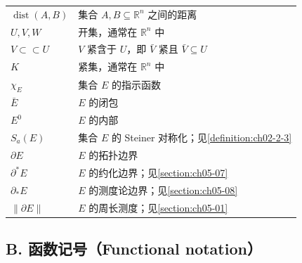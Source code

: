 \documentclass[../../main.tex]{subfiles}%
\begin{document}
\begin{longtable}{@{}p{}p{}@{}}
$\operatorname{dist}(A,B)$ & 集合 $A,B\subseteq\mathbb{R}^n$ 之间的距离 \\
$U,V,W$ & 开集，通常在 $\mathbb{R}^n$ 中 \\
$V\subset\subset U$ & $V$ 紧含于 $U$，即 $\bar V$ 紧且 $\bar V\subseteq U$ \\
$K$ & 紧集，通常在 $\mathbb{R}^n$ 中 \\
$\chi_E$ & 集合 $E$ 的指示函数 \\
$\bar E$ & $E$ 的闭包 \\
$E^0$ & $E$ 的内部 \\
$S_a(E)$ & 集合 $E$ 的 Steiner 对称化；见\cref{definition:ch02-2-3} \\%
$\partial E$ & $E$ 的拓扑边界 \\
$\partial^*E$ & $E$ 的约化边界；见\cref{section:ch05-07} \\%
$\partial_*E$ & $E$ 的测度论边界；见\cref{section:ch05-08} \\%
$\lVert\partial E\rVert$ & $E$ 的周长测度；见\cref{section:ch05-01} \\%
\bottomrule
\end{longtable}

\subsection*{B. 函数记号（Functional notation）}
\end{document}
